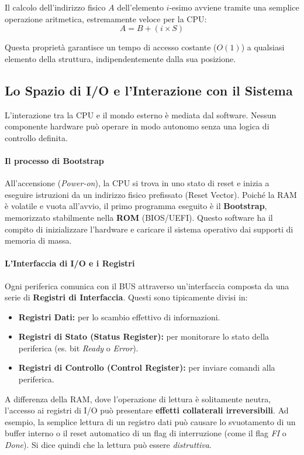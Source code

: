\documentclass[a4paper,12pt]{article}
\begin{document}
	Il calcolo dell'indirizzo fisico $A$ dell'elemento $i$-esimo avviene tramite una semplice operazione aritmetica, estremamente veloce per la CPU:
	\[ A = B + (i \times S) \]
	
	Questa proprietà garantisce un tempo di accesso costante ($O(1)$) a qualsiasi elemento della struttura, indipendentemente dalla sua posizione.
	
	\subsection{Lo Spazio di I/O e l'Interazione con il Sistema}
	
	L'interazione tra la CPU e il mondo esterno è mediata dal software. Nessun componente hardware può operare in modo autonomo senza una logica di controllo definita.
	
	\paragraph{Il processo di Bootstrap}
	All'accensione (\textit{Power-on}), la CPU si trova in uno stato di reset e inizia a eseguire istruzioni da un indirizzo fisico prefissato (Reset Vector). Poiché la RAM è volatile e vuota all'avvio, il primo programma eseguito è il \textbf{Bootstrap}, memorizzato stabilmente nella \textbf{ROM} (BIOS/UEFI). Questo software ha il compito di inizializzare l'hardware e caricare il sistema operativo dai supporti di memoria di massa.
	
	\paragraph{L'Interfaccia di I/O e i Registri}
	Ogni periferica comunica con il BUS attraverso un'interfaccia composta da una serie di \textbf{Registri di Interfaccia}. Questi sono tipicamente divisi in:
	\begin{itemize}
		\item \textbf{Registri Dati:} per lo scambio effettivo di informazioni.
		\item \textbf{Registri di Stato (Status Register):} per monitorare lo stato della periferica (es. bit \textit{Ready} o \textit{Error}).
		\item \textbf{Registri di Controllo (Control Register):} per inviare comandi alla periferica.
	\end{itemize}
	
	\begin{tcolorbox}[colback=orange!5!white,colframe=orange!75!black,title=Effetti Collaterali (Side Effects)]
		A differenza della RAM, dove l'operazione di lettura è solitamente neutra, l'accesso ai registri di I/O può presentare \textbf{effetti collaterali irreversibili}. Ad esempio, la semplice lettura di un registro dati può causare lo svuotamento di un buffer interno o il reset automatico di un flag di interruzione (come il flag \textit{FI} o \textit{Done}). Si dice quindi che la lettura può essere \textit{distruttiva}.
	\end{tcolorbox}
	
\end{document}
